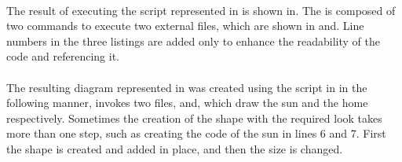 

\paragraph{}
The result of executing the script represented in is shown in. The is composed of two commands to execute two external files, which are shown in and. Line numbers in the three listings are added only to enhance the readability of the code and referencing it.

\paragraph{}
The resulting diagram represented in was created using the script in in the following manner, invokes two files, and, which draw the sun and the home respectively. Sometimes the creation of the shape with the required look takes more than one step, such as creating the code of the sun in lines 6 and 7. First the shape is created and added in place, and then the size is changed.


